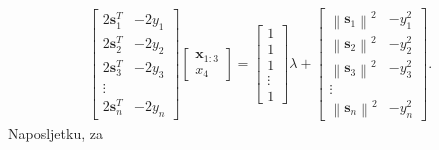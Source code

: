 \documentclass[a4paper,twoside,12pt]{memoir} %
\begin{document}
\begin{align}
\begin{bmatrix}
2\mathbf{s}_1^T & -2y_1 \\
2\mathbf{s}_2^T & -2y_2 \\
2\mathbf{s}_3^T & -2y_3 \\
\vdots \\
2\mathbf{s}_n^T & -2y_n 
\end{bmatrix}
\begin{bmatrix}
\mathbf{x}_{1:3} \\
x_4
\end{bmatrix} =
\begin{bmatrix}
1 \\
1 \\
1 \\
\vdots \\
1 
\end{bmatrix} \lambda + 
\begin{bmatrix}
\left \| \mathbf{s}_1\right \|^2 & -y_1^2\\
\left \| \mathbf{s}_2\right \|^2 & -y_2^2\\
\left \| \mathbf{s}_3\right \|^2 & -y_3^2\\
\vdots \\
\left \| \mathbf{s}_n\right \|^2 & -y_n^2
\end{bmatrix}.
\end{align}
Naposljetku, za
\end{document}
